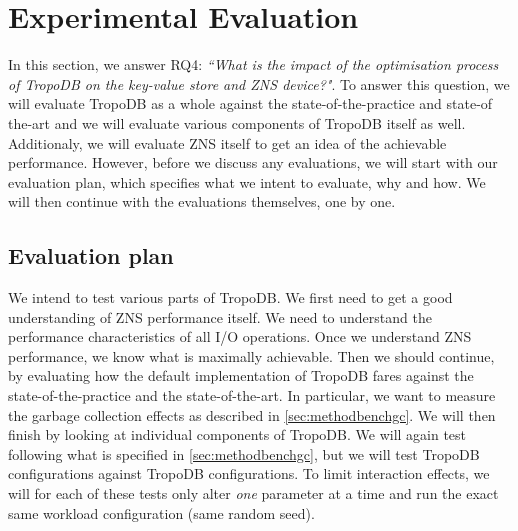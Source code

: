 \chapter{Experimental Evaluation}
\label{sec:experiments}
In this section, we answer RQ4: \textit{``What is the impact of the optimisation process of TropoDB on the key-value store and ZNS device?"}. To answer this question, we will evaluate TropoDB as a whole against the state-of-the-practice and state-of the-art and we will evaluate various components of TropoDB itself as well. Additionaly, we will evaluate ZNS itself to get an idea of the achievable performance. However, before we discuss any evaluations, we will start with our evaluation plan, which specifies what we intent to evaluate, why and how. We will then continue with the evaluations themselves, one by one. 

\section{Evaluation plan}
We intend to test various parts of TropoDB. We first need to get a good understanding of ZNS performance itself. We need to understand the performance characteristics of all I/O operations. Once we understand ZNS performance, we know what is maximally achievable. Then we should continue, by evaluating how the default implementation of TropoDB fares against the state-of-the-practice and the state-of-the-art. In particular, we want to measure the garbage collection effects as described in \autoref{sec:methodbenchgc}. We will then finish by looking at individual components of TropoDB. We will again test following what is specified in \autoref{sec:methodbenchgc}, but we will test TropoDB configurations against TropoDB configurations. To limit interaction effects, we will for each of these tests only alter \textit{one} parameter at a time and run the exact same workload configuration (same random seed).

